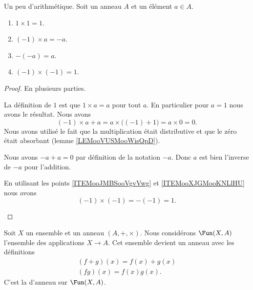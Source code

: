\begin{lemma}        \label{LEMooLTERooVKgqjn}
	Un peu d'arithmétique. Soit un anneau \( A\) et un élément \( a\in A\).
	\begin{enumerate}
		\item       \label{ITEMooUGHCooOPgoeR}
		      \( 1\times 1=1\).
		\item       \label{ITEMooJMBSooVgvVwg}
		      \( (-1)\times a=-a\).
		\item       \label{ITEMooXJGMooKNLlHU}
		      \( -(-a)=a\).
		\item       \label{ITEMooYMRKooHVYYKU}
		      \( (-1)\times (-1)=1\).
	\end{enumerate}
\end{lemma}

\begin{proof}
	En plusieurs parties.
	\begin{subproof}
		La définition de \( 1\) est que \( 1\times a=a\) pour tout \( a\). En particulier pour \( a=1\) nous avons le résultat.
		Nous avons
		\begin{equation}
			(-1)\times a + a= a\times \big( (-1)+1 \big)=a\times 0=0.
		\end{equation}
		Nous avons utilisé le fait que la multiplication était distributive et que le zéro était absorbant (lemme \ref{LEMooVUSMooWisQpD}).

		Nous avons \( -a+a=0\) par définition de la notation \( -a\). Donc \( a\) est bien l'inverse de \( -a\) pour l'addition.

		En utilisant les points \ref{ITEMooJMBSooVgvVwg} et \ref{ITEMooXJGMooKNLlHU} nous avons
		\begin{equation}
			(-1)\times (-1)=-(-1)=1.
		\end{equation}
	\end{subproof}
\end{proof}

Soit \( X\) un ensemble et un anneau \( (A, +, \times)\). Nous considérons \( \Fun(X,A)\) l'ensemble des applications \( X\to A\). Cet ensemble devient un anneau avec les définitions
\begin{subequations}
	\begin{align}
		(f+g)(x)=f(x)+g(x) \\
		(fg)(x)=f(x)g(x).
	\end{align}
\end{subequations}
C'est la  d'anneau sur \( \Fun(X,A)\).

